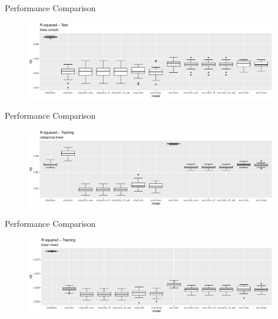 \documentclass[9pt, xcolor=table]{beamer}
\begin{document}
\begin{frame}{Performance Comparison}
\begin{figure}
    \includegraphics[width=11cm]{Figures/Performance/linear_smooth/r2_test.pdf}
\end{figure}
\end{frame}

\begin{frame}{Performance Comparison}
\begin{figure}
    \includegraphics[width=11cm]{Figures/Performance/categorical_linear/r2_train.pdf}
\end{figure}
\end{frame}

\begin{frame}{Performance Comparison}
\begin{figure}
    \includegraphics[width=11cm]{Figures/Performance/linear_mixed/r2_train.pdf}
\end{figure}
\end{frame}
\end{document}
